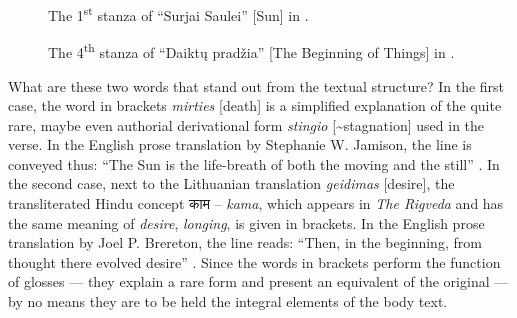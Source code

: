 \begin{paper}
\begin{figure}[H]
    \centering
    \caption{The 1\textsuperscript{st} stanza of ``Surjai Saulei'' [Sun] in \citealt[308]{maironis_pavasario_2020-1}.}
    \label{fig:subacius1}

\end{figure}

\begin{figure}[H]
    \centering
    \caption{The 4\textsuperscript{th} stanza of ``Daiktų pradžia'' [The Beginning of Things] in \citealt[300]{maironis_pavasario_2020-1}.}
    \label{fig:subacius2}
\end{figure}

What are these two words that stand out from the textual structure? In
the first case, the word in brackets \emph{mirties} {[}death{]} is a
simplified explanation of the quite rare, maybe even authorial
derivational form \emph{stingio} {[}\textasciitilde stagnation{]} used
in the verse. In the English prose translation by Stephanie W. Jamison,
the line is conveyed thus: ``The Sun is the life-breath of both the
moving and the still'' \parencite[267]{jamison_rigveda_2014}. In the second
case, next to the Lithuanian translation \emph{geidimas} {[}desire{]},
the transliterated Hindu concept \texthindi{काम}
-- \emph{kama}, which appears in
\emph{The Rigveda} and has the same meaning of \emph{desire},
\emph{longing}, is given in brackets. In the English prose translation
by Joel P. Brereton, the line reads: ``Then, in the beginning, from
thought there evolved desire'' \parencite[1607]{jamison_rigveda_2014}. Since
the words in brackets perform the function of glosses –– they explain a
rare form and present an equivalent of the original –– by no means
they are to be held the integral elements of the body text.


\end{paper}
